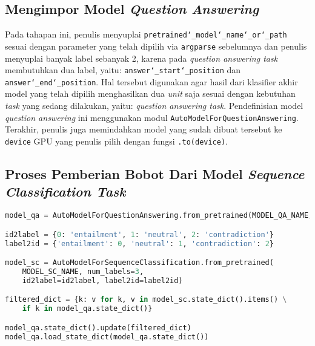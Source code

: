 \subsection{Mengimpor Model \emph{Question Answering}}
Pada tahapan ini, penulis menyuplai \texttt{pretrained\char`_model\char`_name\char`_or\char`_path} sesuai dengan parameter yang telah dipilih via \texttt{argparse} sebelumnya dan penulis menyuplai banyak label sebanyak 2, karena pada \emph{question answering task} membutuhkan dua label, yaitu: \texttt{answer\char`_start\char`_position} dan \texttt{answer\char`_end\char`_position}. Hal tersebut digunakan agar hasil dari klasifier akhir model yang telah dipilih menghasilkan dua \emph{unit} saja sesuai dengan kebutuhan \emph{task} yang sedang dilakukan, yaitu: \emph{question answering task}. Pendefinisian model \emph{question answering} ini menggunakan modul \texttt{AutoModelForQuestionAnswering}. Terakhir, penulis juga memindahkan model yang sudah dibuat tersebut ke \texttt{device} GPU yang penulis pilih dengan fungsi \texttt{.to(device)}.

\subsection{Proses Pemberian Bobot Dari Model \emph{Sequence Classification Task}}

\begin{lstlisting}[language=Python, caption=Proses pemberian bobot dari model \emph{sequence classification task}]
model_qa = AutoModelForQuestionAnswering.from_pretrained(MODEL_QA_NAME, num_labels=2)

id2label = {0: 'entailment', 1: 'neutral', 2: 'contradiction'}
label2id = {'entailment': 0, 'neutral': 1, 'contradiction': 2}

model_sc = AutoModelForSequenceClassification.from_pretrained(
    MODEL_SC_NAME, num_labels=3, 
    id2label=id2label, label2id=label2id)

filtered_dict = {k: v for k, v in model_sc.state_dict().items() \
    if k in model_qa.state_dict()}

model_qa.state_dict().update(filtered_dict)
model_qa.load_state_dict(model_qa.state_dict())
\end{lstlisting}

